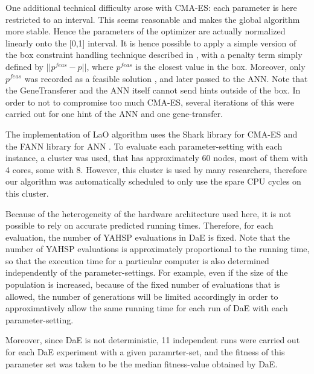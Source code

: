 \documentclass{MYsig-alternate}
\begin{document}
One additional technical difficulty arose with CMA-ES: each parameter is here restricted to an interval. This seems reasonable and makes the global algorithm more stable. Hence the parameters of the optimizer are actually normalized linearly onto the [0,1] interval. It is hence possible to apply a simple version of the box constraint handling technique described in \cite{hansen2009tec}, with a penalty term simply defined by \begin{math}||p^{feas}-p|| \end{math}, where \begin{math}p^{feas}\end{math} is the closest value in the box. Moreover, only \begin{math}p^{feas}\end{math} was recorded as a feasible solution , and later passed to the ANN. Note that the GeneTransferer and the ANN itself cannot send hints outside of the box. In order to not to compromise too much CMA-ES, several iterations of this were carried out for one hint of the ANN and one gene-transfer.

The implementation of LaO algorithm uses the Shark library \cite{shark08} for CMA-ES and the FANN library for ANN \cite{nissen}. To evaluate each parameter-setting with each instance,  a cluster was used, that has approximately 60 nodes, most of them with 4 cores, some with 8. However, this cluster is used by many researchers, therefore our algorithm was automatically scheduled to only use the spare CPU cycles on this cluster.

Because of the heterogeneity of the hardware architecture used here, it is not possible to rely on accurate predicted running times. Therefore, for each evaluation, the number of YAHSP evaluations in DaE is fixed. Note that the number of YAHSP evaluations is approximately proportional to the running time, so that the execution time for a particular computer is also determined independently of the parameter-settings. For example, even if the size of the population is increased, because of the fixed number of evaluations that is allowed, the number of generations will be limited accordingly in order to approximatively allow the same running time for each run of DaE with each parameter-setting. 


Moreover, since DaE is not deterministic, 11 independent runs were carried out for each DaE experiment with a given paramrter-set, and the fitness of this parameter set was taken to be the median fitness-value obtained by DaE.
\end{document}
